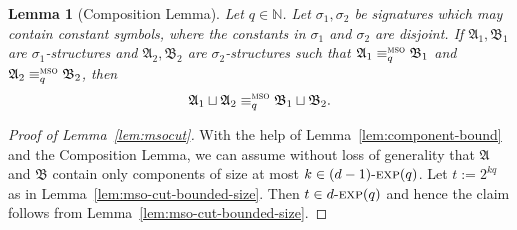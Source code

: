 \documentclass[11pt]{article}
\newtheorem{lemma}[theorem]{Lemma}
\newcommand{\logic}[1]{\textsc{#1}}
\newcommand{\MSO}{\logic{mso}}
\newcommand{\eleq}[1][]{\equiv_{#1}}
\newcommand{\msoeleq}[1][]{\eleq[#1]^{\MSO{}}}
\newcommand{\struct}[1]{\mathfrak{#1}}
\newcommand{\AS}{\struct{A}}
\newcommand{\BS}{\struct{B}}
\newcommand{\N}{\mathbb{N}}
\newcommand{\disunion}{\sqcup}
\newcommand{\nexp}[1][d]{\ensuremath{#1\textnormal{-}\textsc{exp}}}
\begin{document}
\begin{lemma}[Composition Lemma]
  Let $q\in \N$. Let $\sigma_1, \sigma_2$ be signatures which may
  contain constant symbols, where the constants in $\sigma_1$ and
  $\sigma_2$ are disjoint. If $\AS_1,\BS_1$ are $\sigma_1$-structures
  and $\AS_2,\BS_2$ are $\sigma_2$-structures such that
  $\AS_1\msoeleq[q] \BS_1$ and $\AS_2\msoeleq[q] \BS_2$, then
  \[ \AS_1 \disunion \AS_2 \msoeleq[q] \BS_1 \disunion \BS_2. \]
\end{lemma}

\begin{proof}[Proof of Lemma~\ref{lem:msocut}]
  With the help of Lemma~\ref{lem:component-bound} and the Composition
  Lemma, we can assume without loss of generality that $\AS$ and $\BS$
  contain only components of size at most $k\in \nexp[(d-1)](q)$. Let
  $t:=2^{kq}$ as in Lemma~\ref{lem:mso-cut-bounded-size}. Then $t\in
  \nexp[d](q)$ and hence the claim follows from
  Lemma~\ref{lem:mso-cut-bounded-size}.
\end{proof}
\end{document}
